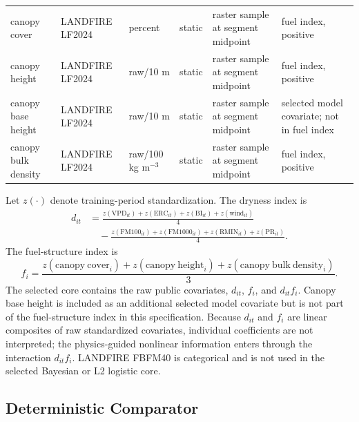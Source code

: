 \documentclass[11pt]{article}
\begin{document}
\begin{table}[!htbp]
\begin{tabular}{L{0.14\textwidth} L{0.11\textwidth} L{0.15\textwidth} L{0.17\textwidth} L{0.17\textwidth} L{0.17\textwidth}}
    canopy cover & LANDFIRE LF2024 & percent & static & raster sample at segment midpoint & fuel index, positive \\
    canopy height & LANDFIRE LF2024 & raw/10 m & static & raster sample at segment midpoint & fuel index, positive \\
    canopy base height & LANDFIRE LF2024 & raw/10 m & static & raster sample at segment midpoint & selected model covariate; not in fuel index \\
    canopy bulk density & LANDFIRE LF2024 & raw/100 kg m$^{-3}$ & static & raster sample at segment midpoint & fuel index, positive \\
    \bottomrule
  \end{tabular}
\end{table}

Let $z(\cdot)$ denote training-period standardization. The dryness index is
\begin{equation}
  \begin{split}
    d_{it}
    &=
    \frac{z(\mathrm{VPD}_{it})+z(\mathrm{ERC}_{it})+z(\mathrm{BI}_{it})+
    z(\mathrm{wind}_{it})}{4}\\
    &\quad -
    \frac{z(\mathrm{FM100}_{it})+z(\mathrm{FM1000}_{it})+
    z(\mathrm{RMIN}_{it})+z(\mathrm{PR}_{it})}{4}.
  \end{split}
\end{equation}
The fuel-structure index is
\begin{equation}
  f_i =
  \frac{
  z(\mathrm{canopy\ cover}_i)+
  z(\mathrm{canopy\ height}_i)+
  z(\mathrm{canopy\ bulk\ density}_i)
  }{3}.
\end{equation}
The selected core contains the raw public covariates, $d_{it}$, $f_i$, and
$d_{it}f_i$. Canopy base height is included as an additional selected model
covariate but is not part of the fuel-structure index in this specification.
Because $d_{it}$ and $f_i$ are linear composites of raw standardized covariates,
individual coefficients are not interpreted; the physics-guided nonlinear
information enters through the interaction $d_{it}f_i$. LANDFIRE FBFM40 is
categorical and is not used in the selected Bayesian or L2 logistic core.

\subsection{Deterministic Comparator}
\end{document}
